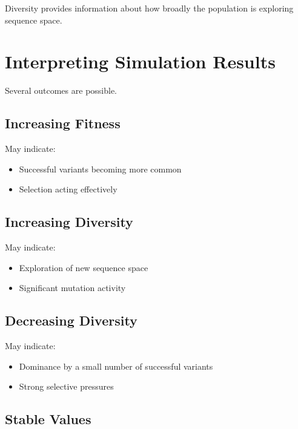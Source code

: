 \documentclass[
  oneside,
  openany]{book}
\providecommand{\tightlist}{%
  \setlength{\itemsep}{0pt}\setlength{\parskip}{0pt}}
\begin{document}
Diversity provides information about how broadly the population is exploring sequence space.

\section{Interpreting Simulation Results}\label{interpreting-simulation-results}

Several outcomes are possible.

\subsection{Increasing Fitness}\label{increasing-fitness}

May indicate:

\begin{itemize}
\tightlist
\item
  Successful variants becoming more common
\item
  Selection acting effectively
\end{itemize}

\subsection{Increasing Diversity}\label{increasing-diversity}

May indicate:

\begin{itemize}
\tightlist
\item
  Exploration of new sequence space
\item
  Significant mutation activity
\end{itemize}

\subsection{Decreasing Diversity}\label{decreasing-diversity}

May indicate:

\begin{itemize}
\tightlist
\item
  Dominance by a small number of successful variants
\item
  Strong selective pressures
\end{itemize}

\subsection{Stable Values}\label{stable-values}
\end{document}
